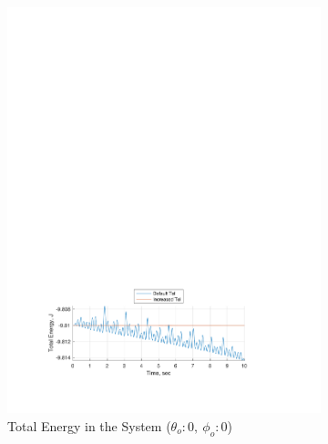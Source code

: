 \documentclass[12pt]{report}
\begin{document}
\begin{flushleft}
\begin{figure}[!htp]
  \center
  \caption{Total Energy Comparison Plots}
\begin{subfigure}[t]{\textwidth}
  \includegraphics[center,width=.9\textwidth]{Energy1}
  \caption{Total Energy in the System ($\theta_o:0,~\phi_o:0$)}
  \label{fig:Energy1}
\end{subfigure}
\begin{subfigure}[t]{\textwidth}

\end{subfigure}
\end{figure}
\end{flushleft}
\end{document}

